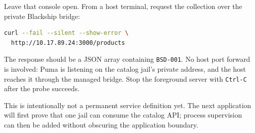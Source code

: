 Leave that console open. From a host terminal, request the collection over the
private Blackship bridge:

\begin{lstlisting}[language=sh]
curl --fail --silent --show-error \
  http://10.17.89.24:3000/products
\end{lstlisting}

The response should be a JSON array containing \texttt{BSD-001}. No host port
forward is involved: Puma is listening on the catalog jail's private address,
and the host reaches it through the managed bridge. Stop the foreground server
with \texttt{Ctrl-C} after the probe succeeds.

This is intentionally not a permanent service definition yet. The next
application will first prove that one jail can consume the catalog API; process
supervision can then be added without obscuring the application boundary.
